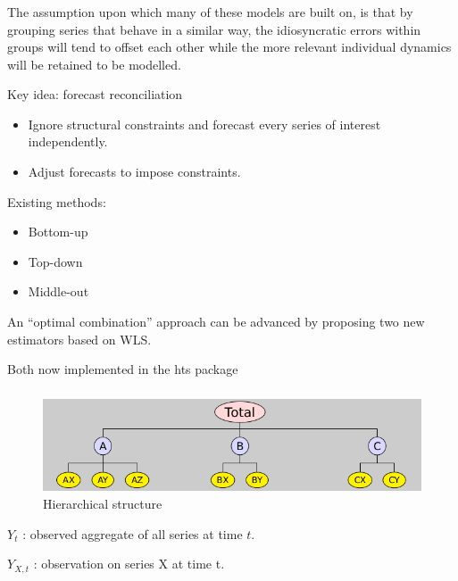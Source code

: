 \documentclass[c, dvipsnames]{beamer}  %
\begin{document}
\begin{frame}[shrink=5]
\frametitle{\insertsection} 
\framesubtitle{\insertsubsection}



The assumption upon which many of these models are built on, is that by grouping series that behave in a similar way, the idiosyncratic errors within groups will tend to offset each other while the more relevant individual dynamics will be retained to be modelled.



Key idea: forecast reconciliation
\begin{itemize}
	\item Ignore structural constraints and forecast
	every series of interest independently.
	\item Adjust forecasts to impose constraints.
\end{itemize}

Existing methods:
\begin{itemize}
	\item  Bottom-up
	\item  Top-down
	\item  Middle-out
	
\end{itemize}

An “optimal combination” 
approach can be advanced by proposing two new estimators
based on WLS.

Both now implemented in the hts package





\end{frame}


\begin{frame}[shrink=5]
\frametitle{\insertsection} 
\framesubtitle{\insertsubsection}

\begin{figure}
\centering
\includegraphics[width=0.7\linewidth]{screenshot010}
\caption{Hierarchical structure}
\label{fig:screenshot010}
\end{figure}


$ Y_t $ : observed aggregate of all
series at time $ t $.

$ Y_{ X , t} $ : observation on series X at
time t.

\end{frame}
\end{document}

